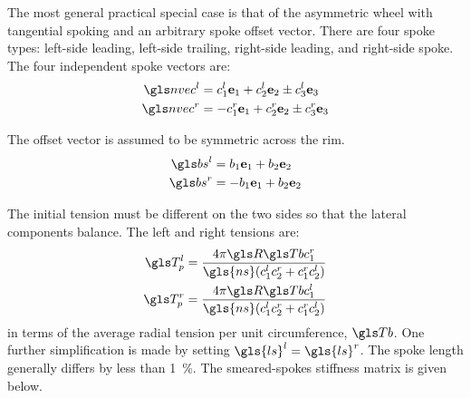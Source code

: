 \documentclass[../../thesis.tex]{subfiles}
\begin{document}
The most general practical special case is that of the asymmetric wheel with tangential spoking and an arbitrary spoke offset vector. There are four spoke types: left-side leading, left-side trailing, right-side leading, and right-side spoke. The four independent spoke vectors are:
\begin{subequations}
\begin{align}
\n^l &= c_1^l \eo + c_2^l \et \pm c_3^l \eh\\
\n^r &= -c_1^r \eo + c_2^r \et \pm c_3^r \eh
\end{align}
\end{subequations}

The offset vector is assumed to be symmetric across the rim.
\begin{subequations}
\begin{align}
\bs^l &= b_1 \eo + b_2 \et\\
\bs^r &= -b_1 \eo + b_2 \et
\end{align}
\end{subequations}

The initial tension must be different on the two sides so that the lateral components balance. The left and right tensions are:
\begin{subequations}
\begin{align}
\T_p^l &= \frac{4\pi \R \Tb c_1^r}{\gls{ns}(c_1^lc_2^r + c_1^rc_2^l)}\\
\T_p^r &= \frac{4\pi \R \Tb c_1^l}{\gls{ns}(c_1^lc_2^r + c_1^rc_2^l)}
\end{align}
\end{subequations}
in terms of the average radial tension per unit circumference, $\Tb$. One further simplification is made by setting $\gls{ls}^l=\gls{ls}^r$. The spoke length generally differs by less than \SI{1}{\percent}. The smeared-spokes stiffness matrix is given below.
\end{document}
